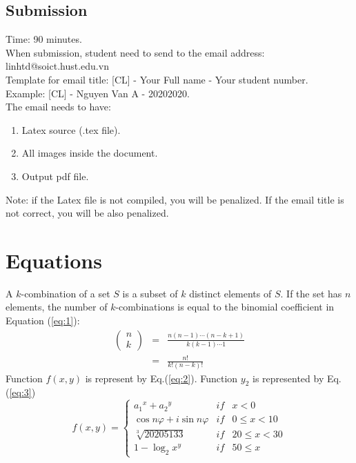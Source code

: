 \documentclass{article}
\begin{document}
		\subsection{Submission}
			Time: 90 minutes.\\
			When submission, student need to send to the email address: linhtd@soict.hust.edu.vn\\
			Template for email title: [CL] - Your Full name - Your student number.\\
			Example: [CL] - Nguyen Van A - 20202020.\\
			The email needs to have:
			\begin{enumerate}
				\item Latex source (.tex file).
				\item All images inside the document.
				\item Output pdf file.
			\end{enumerate}
			Note: if the Latex file is not compiled, you will be penalized. If the email title is not correct, you will be also penalized.
	\section{Equations}
		A $k$-combination of a set $S$ is a subset of $k$ distinct elements of $S$. If the set has $n$ elements, the number of $k$-combinations is equal to the binomial coefficient in Equation (\ref{eq:1}):
		\begin{eqnarray}
			\left(
			\begin{array}{c} 
				n\\k
			\end{array}
			\right)
			& = & \frac{n(n-1)\cdots(n-k+1)}{k(k-1)\cdots1} \nonumber \\
			& = & \frac{n!}{k!(n-k)!}
		\label{eq:1}
		\end{eqnarray}
		Function $f(x, y)$ is represent by Eq.(\ref{eq:2}). Function $y_2$ is represented by Eq.(\ref{eq:3})
		\begin{equation}
			f(x,y) =
			\left \{
			\begin{array}{ccl}
				{a_1}^x+{a_2}^y                 & if & x<0             \\
				\cos{n\varphi} +i\sin{n\varphi} & if & 0 \leq x < 10   \\
				\sqrt[3]{20205133}              & if & 20 \leq x < 30  \\
				1 - \log_2 x^y                  & if & 50 \leq x
			\end{array}
			\right .
		\label{eq:2}
		\end{equation}
		
\end{document}
